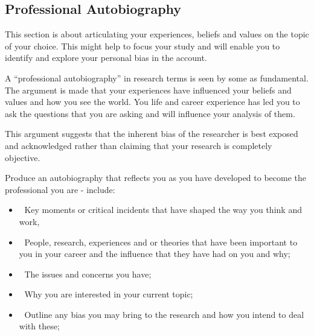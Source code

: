 \subsection{Professional Autobiography}
This section is about articulating your experiences, beliefs and values on the topic of your choice. This might help to focus your study and will enable you to identify and explore your personal bias in the account. 

A “professional autobiography” in research terms is seen by some as fundamental. The argument is made that your experiences have influenced your beliefs and values and how you see the world. You life and career experience has led you to ask the questions that you are asking and will influence your analysis of them.

This argument suggests that the inherent bias of the researcher is best exposed and acknowledged rather than claiming that your research is completely objective. 

Produce an autobiography that reflects you as you have developed to become the professional you are - include: 

\begin{itemize}
\item  Key moments or critical incidents that have shaped the way you think and work, 
\end{itemize}
\begin{itemize}
\item  People, research, experiences and or theories that have been important to you in your career and the influence that they have had on you and why;
\end{itemize}
\begin{itemize}
\item  The issues and concerns you have;
\end{itemize}
\begin{itemize}
\item  Why you are interested in your current topic;
\end{itemize}
\begin{itemize}
\item  Outline any bias you may bring to the research and how you intend to deal with these;
\end{itemize}


